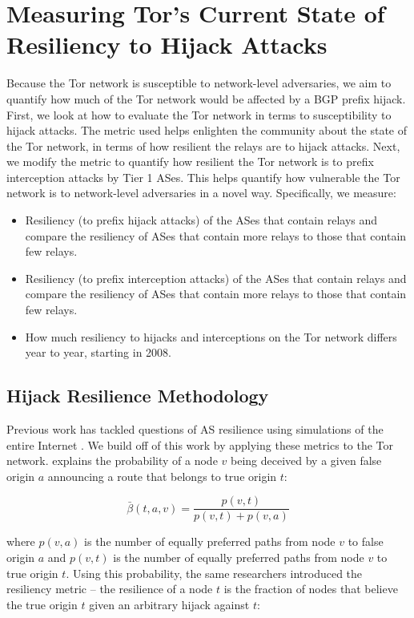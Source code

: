 \section{Measuring Tor's Current State of Resiliency to Hijack Attacks}

Because the Tor network is susceptible to network-level adversaries, we aim to quantify how much of the Tor network would be affected by a BGP prefix hijack.  First, we look at how to evaluate the Tor network in terms to susceptibility to hijack attacks.  The metric used helps enlighten the community about the state of the Tor network, in terms of how resilient the relays are to hijack attacks.  Next, we modify the metric to quantify how resilient the Tor network is to prefix interception attacks by Tier 1 ASes.  This helps quantify how vulnerable the Tor network is to network-level adversaries in a novel way.  Specifically, we measure:

\begin{itemize}
\item Resiliency (to prefix hijack attacks) of the ASes that contain relays and compare the resiliency of ASes that contain more relays to those that contain few relays.
\item Resiliency (to prefix interception attacks) of the ASes that contain relays and compare the resiliency of ASes that contain more relays to those that contain few relays.
\item How much resiliency to hijacks and interceptions on the Tor network differs year to year, starting in 2008.
\end{itemize}

\subsection{Hijack Resilience Methodology}
\label{hijack_methodology}

Previous work has tackled questions of AS resilience using simulations of the entire Internet \cite{lad2007understanding}.  We build off of this work by applying these metrics to the Tor network.  \cite{lad2007understanding} explains the probability of a node $v$ being deceived by a given false origin $a$ announcing a route that belongs to true origin $t$:

\begin{equation}
\bar{\beta}(t,a,v) = \frac {p(v,t)} {p(v,t) + p(v,a)}
\end{equation}

where $p(v,a)$ is the number of equally preferred paths from node $v$ to false origin $a$ and $p(v,t)$ is the number of equally preferred paths from node $v$ to true origin $t$.  Using this probability, the same researchers introduced the resiliency metric -- the resilience of a node $t$ is the fraction of nodes that believe the true origin $t$ given an arbitrary  hijack against $t$:

